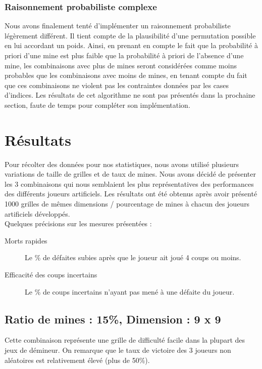 \documentclass{article}
\begin{document}
\subsubsection{Raisonnement probabiliste complexe}
Nous avons finalement tenté d'implémenter un raisonnement probabiliste légèrement différent.
Il tient compte de la plausibilité d’une permutation possible en lui accordant un poids. 
Ainsi, en prenant en compte le fait que la probabilité à priori d'une mine est plus faible 
que la probabilité à priori de l'absence d'une mine, les combinaisons avec plus de mines
seront considérées comme moins probables que les combinaisons avec moins de mines, en tenant compte du fait que
ces combinaisons ne violent pas les contraintes données par les cases d'indices.
Les résultats de cet algorithme ne sont pas présentés dans la prochaine section, faute de temps pour 
compléter son implémentation.

\section{Résultats}
Pour récolter des données pour nos statistiques, nous avons utilisé plusieurs variations de taille de grilles et de taux de mines. Nous avons
décidé de présenter les 3 combinaisons qui nous semblaient les plus représentatives des performances des différents joueurs artificiels.
Les résultats ont été obtenus après avoir présenté 1000 grilles de mêmes dimensions / pourcentage de mines à chacun des joueurs artificiels 
développés. \\

Quelques précisions sur les mesures présentées : 
\begin{description}
	\item[Morts rapides] Le \% de défaites subies après que le joueur ait joué 4 coups ou moins.
	\item[Efficacité des coups incertains] Le \% de coups incertains n'ayant pas mené à une défaite du joueur.
\end{description}

\subsection{Ratio de mines : 15\%, Dimension : 9 x 9}

Cette combinaison représente une grille de difficulté facile dans la plupart des jeux de démineur. On remarque que le taux de victoire
des 3 joueurs non aléatoires est relativement élevé (plus de 50\%).
\end{document}
